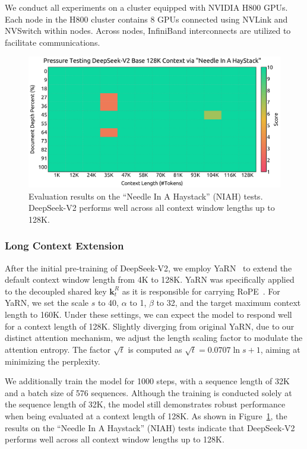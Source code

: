 \documentclass[11pt, a4paper, logo, copyright, nonumbering]{deepseek}
\newcommand{\dsvii}{DeepSeek-V2}
\begin{document}
\begin{CJK*}{UTF8}{gbsn}
We conduct all experiments on a cluster equipped with NVIDIA H800 GPUs. 
Each node in the H800 cluster contains 8 GPUs connected using NVLink and NVSwitch within nodes. 
Across nodes, InfiniBand interconnects are utilized to facilitate communications. 

\begin{figure}[!t]
\centering
\includegraphics[width=0.98\linewidth]{figures/needle_in_a_haystack.pdf}
\caption{
Evaluation results on the ``Needle In A Haystack'' (NIAH) tests. 
\dsvii{} performs well across all context window lengths up to 128K. 
}
\label{fig:long_context}
\end{figure}

\subsubsection{Long Context Extension}

After the initial pre-training of \dsvii{}, we employ YaRN~\citep{peng2023yarn} to extend the default context window length from 4K to 128K. 
YaRN was specifically applied to the decoupled shared key $\mathbf{k}^R_t$ as it is responsible for carrying RoPE~\citep{su2024roformer}. 
For YaRN, we set the scale $s$ to 40, $\alpha$ to 1, $\beta$ to 32, and the target maximum context length to 160K. 
Under these settings, we can expect the model to respond well for a context length of 128K. 
Slightly diverging from original YaRN, due to our distinct attention mechanism, we adjust the length scaling factor to modulate the attention entropy. 
The factor $\sqrt{t}$ is computed as $\sqrt{t} = 0.0707 \ln{s} + 1$, aiming at minimizing the perplexity.

We additionally train the model for 1000 steps, with a sequence length of 32K and a batch size of 576 sequences. 
Although the training is conducted solely at the sequence length of 32K, the model still demonstrates robust performance when being evaluated at a context length of 128K. 
As shown in Figure~\ref{fig:long_context}, the results on the ``Needle In A Haystack'' (NIAH) tests indicate that \dsvii{} performs well across all context window lengths up to 128K.


\end{CJK*}
\end{document}
